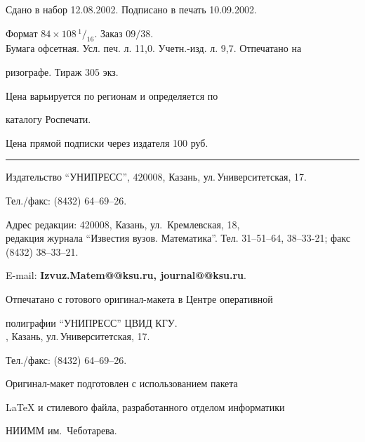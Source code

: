 \setlength{\hoffset}{-23mm}


\bigskip


\noindent Сдано в набор 12.08.2002. Подписано в печать 10.09.2002.


Формат $84\times 108 \,^1/_{16}.$ Заказ $09/38$.\\


Бумага офсетная. Усл. печ. л. 11,0. Учетн.-изд. л. 9,7. Отпечатано на 


ризографе. Тираж $305$ экз. 





\noindent Цена варьируется по регионам и определяется по 


каталогу Роспечати. 





\noindent Цена прямой подписки через издателя 100 руб. 


\bigskip


\hrule


\bigskip


\noindent Издательство ``УНИПРЕСС'', 420008, Казань, ул.\,Университетская, 17.


Тел./факс: (8432) 64--69--26.\\


\smallskip





\noindent Адрес редакции: 420008, Казань, ул.~Кремлевская, 18,\\  


редакция журнала  ``Известия вузов. Математика''. Тел. 31--51--64, 38--33-21; факс (8432) 38--33--21.





\noindent E-mail: {\bf Izvuz.Matem@@ksu.ru, journal@@ksu.ru}. \par


\bigskip 


\noindent Отпечатано с готового оригинал-макета в Центре оперативной


полиграфии ``УНИПРЕСС'' ЦВИД КГУ. \\





, Казань, ул.\,Университетская, 17.


Тел./факс: (8432) 64--69--26. \par


\bigskip


\noindent Оригинал-макет подготовлен с использованием пакета


\AmS\LaTeX{} и стилевого файла, разработанного отделом информатики


НИИММ им.~Чеботарева.








